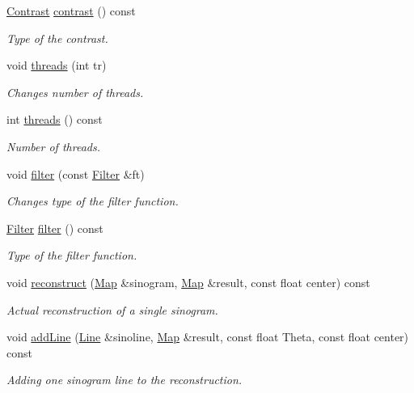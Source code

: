\begin{DoxyCompactItemize}
\hyperlink{classContrast}{Contrast} \hyperlink{classCTrec_a2b6d5eae79d780394a6cf2f0a7e860a6}{contrast} () const 
\begin{DoxyCompactList}\small\item\em Type of the contrast. \item\end{DoxyCompactList}\item 
void \hyperlink{classCTrec_a56c428df8144213e53cf87029134a3ac}{threads} (int tr)
\begin{DoxyCompactList}\small\item\em Changes number of threads. \item\end{DoxyCompactList}\item 
int \hyperlink{classCTrec_af59a5e43cbdc7047ee5da7391d9c0385}{threads} () const 
\begin{DoxyCompactList}\small\item\em Number of threads. \item\end{DoxyCompactList}\item 
void \hyperlink{classCTrec_a3220ac29961577f2070a01612aa609fb}{filter} (const \hyperlink{classFilter}{Filter} \&ft)
\begin{DoxyCompactList}\small\item\em Changes type of the filter function. \item\end{DoxyCompactList}\item 
\hyperlink{classFilter}{Filter} \hyperlink{classCTrec_a271d4389ba40526d7c50324f5973365b}{filter} () const 
\begin{DoxyCompactList}\small\item\em Type of the filter function. \item\end{DoxyCompactList}\item 
void \hyperlink{classCTrec_a8a82f56167150e59d38bf831e812c4ea}{reconstruct} (\hyperlink{group__Types_ga8747378c016fc11d9ecbb98787248c25}{Map} \&sinogram, \hyperlink{group__Types_ga8747378c016fc11d9ecbb98787248c25}{Map} \&result, const float center) const 
\begin{DoxyCompactList}\small\item\em Actual reconstruction of a single sinogram. \item\end{DoxyCompactList}\item 
void \hyperlink{classCTrec_acb42c0e929a3d2ee57bf9718b00686df}{addLine} (\hyperlink{group__Types_ga4ce3fdeba27702c8b09a141e22709e38}{Line} \&sinoline, \hyperlink{group__Types_ga8747378c016fc11d9ecbb98787248c25}{Map} \&result, const float Theta, const float center) const 
\begin{DoxyCompactList}\small\item\em Adding one sinogram line to the reconstruction. \item\end{DoxyCompactList}\end{DoxyCompactItemize}

